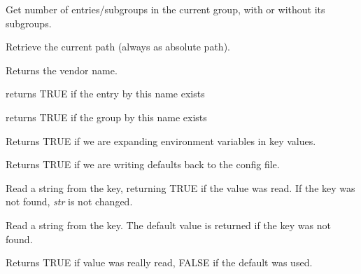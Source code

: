 Get number of entries/subgroups in the current group, with or without its
subgroups.

\label{wxconfigbasegetpath}


Retrieve the current path (always as absolute path).

\label{wxconfigbasegetvendorname}


Returns the vendor name.

\label{wxconfigbasehasentry}


returns TRUE if the entry by this name exists

\label{wxconfigbasehasgroup}


returns TRUE if the group by this name exists

\label{wxconfigbaseisexpandingenvvars}


Returns TRUE if we are expanding environment variables in key values.

\label{wxconfigbaseisrecordingdefaults}


Returns TRUE if we are writing defaults back to the config file.

\label{wxconfigbaseread}


Read a string from the key, returning TRUE if the value was read. If the key
was not found, {\it str} is not changed.


Read a string from the key. The default value is returned if the key was not
found.

Returns TRUE if value was really read, FALSE if the default was used.

